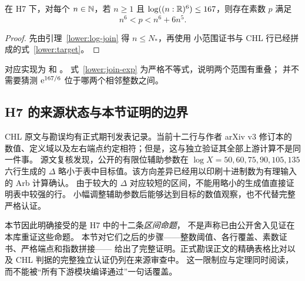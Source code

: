 \begin{theorem}[完整整数下段]\label{lower:log-theorem}
在 H7 下，对每个 $n\in\mathbb N$，若 $n\geq1$ 且
$\log((n:\mathbb R)^6)\leq167$，则存在素数 $p$ 满足
\[
 n^6<p<n^6+6n^5.
\]
\end{theorem}

\begin{proof}
先由引理~\ref{lower:log-join} 得 $n\leq N_*$，再使用
小范围证书与 CHL 行已经拼成的式~\eqref{lower:target}。
\end{proof}

对应实现为  和
。
式~\eqref{lower:join-exp} 为严格不等式，说明两个范围有重叠；
并不需要猜测 $\mathrm e^{167/6}$ 位于哪两个相邻整数之间。

\subsection{H7 的来源状态与本节证明的边界}

CHL 原文与勘误均有正式期刊发表记录。当前十二行与作者 arXiv v3 修订本的
数值、定义域以及左右端点约定相符；但是，这与独立验证其全部上游计算不是同一件事。
源文复核发现，公开的有限位辅助参数在
$\log X=50,60,75,90,105,135$ 六行生成的 $\Delta$
略小于表中目标值。该方向差异已经用以印刷十进制数为有理输入的 Arb 计算确认。
由于较大的 $\Delta$ 对应较短的区间，不能用略小的生成值直接证明表中较强的行。
小幅调整辅助参数后能够达到目标的数值观察，也不代替完整严格认证。

本节因此明确接受的是 H7 中的十二条\emph{区间命题}，
不是声称已由公开舍入见证在本库重证这些命题。
本节对它们之后的步骤——整数阈值、各行覆盖、素数证书、严格端点和指数拼接——
给出了完整证明。正式勘误正文的精确表格比对以及 CHL 判据的完整独立认证仍列在来源审查中。
这一限制应与定理同时阅读，而不能被“所有下游模块编译通过”一句话覆盖。
